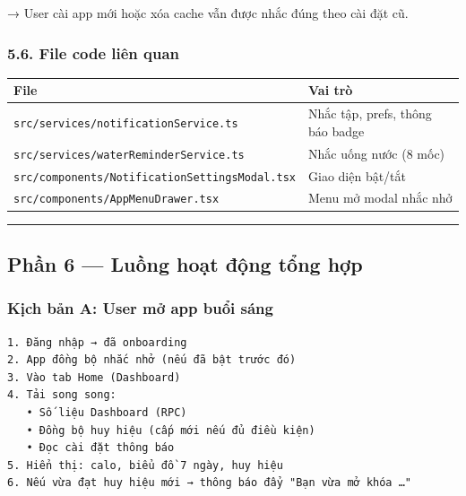 \documentclass[12pt,a4paper]{article}
\begin{document}
→ User cài app mới hoặc xóa cache vẫn được nhắc đúng theo cài đặt cũ.

\subsubsection{5.6. File code liên quan}\label{file-code-liuxean-quan-2}

{\def\LTcaptype{none} %
\begin{longtable}[]{@{}
  >{\raggedright\arraybackslash}p{}
  >{\raggedright\arraybackslash}p{}@{}}
\toprule\noalign{}
\begin{minipage}[b]{\linewidth}\raggedright
File
\end{minipage} & \begin{minipage}[b]{\linewidth}\raggedright
Vai trò
\end{minipage} \\
\midrule\noalign{}
\endhead
\bottomrule\noalign{}
\endlastfoot
\texttt{src/services/notificationService.ts} & Nhắc tập, prefs, thông
báo badge \\
\texttt{src/services/waterReminderService.ts} & Nhắc uống nước (8
mốc) \\
\texttt{src/components/NotificationSettingsModal.tsx} & Giao diện
bật/tắt \\
\texttt{src/components/AppMenuDrawer.tsx} & Menu mở modal nhắc nhở \\
\end{longtable}
}

\begin{center}\rule{0.5\linewidth}{0.5pt}\end{center}

\subsection{Phần 6 --- Luồng hoạt động tổng
hợp}\label{phux1ea7n-6-luux1ed3ng-houx1ea1t-ux111ux1ed9ng-tux1ed5ng-hux1ee3p}

\subsubsection{Kịch bản A: User mở app buổi
sáng}\label{kux1ecbch-bux1ea3n-a-user-mux1edf-app-buux1ed5i-suxe1ng}

\begin{verbatim}
1. Đăng nhập → đã onboarding
2. App đồng bộ nhắc nhở (nếu đã bật trước đó)
3. Vào tab Home (Dashboard)
4. Tải song song:
   • Số liệu Dashboard (RPC)
   • Đồng bộ huy hiệu (cấp mới nếu đủ điều kiện)
   • Đọc cài đặt thông báo
5. Hiển thị: calo, biểu đồ 7 ngày, huy hiệu
6. Nếu vừa đạt huy hiệu mới → thông báo đẩy "Bạn vừa mở khóa …"
\end{verbatim}
\end{document}
